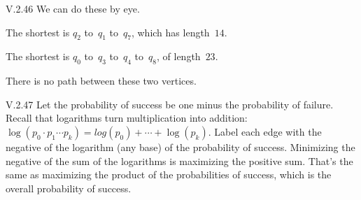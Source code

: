 %
\begin{ans}{V.2.46}
We can do these by eye.
\begin{exparts}
\item The shortest is $q_2$ to~$q_1$ to~$q_7$, which has length~$14$.
\item The shortest is $q_0$ to~$q_3$ to~$q_4$ to~$q_8$, of length~$23$.
\item There is no path between these two vertices.
\end{exparts}
\end{ans}
%
\begin{ans}{V.2.47}
Let the probability of success be one minus the probability of failure.
Recall that logarithms turn multiplication into
addition:~$\log(p_0\cdot p_1\cdots p_k)=log(p_0)+\cdots+\log(p_k)$.
Label each edge with the negative of the logarithm (any base) of the
probability of success.
Minimizing the negative of the sum of the logarithms is maximizing
the positive sum.
That's the same as maximizing the product of the probabilities of
success, which is the overall probability of success.
\end{ans}
%
